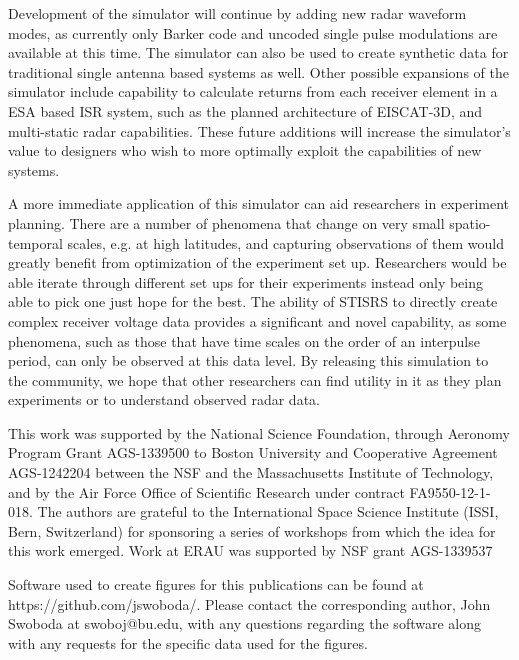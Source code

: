 \documentclass[draft,ras]{agutex}
\begin{document}
\begin{article}
Development of the simulator will continue by adding new radar waveform modes, as currently only Barker code and uncoded single pulse modulations are available at this time. The simulator can also be used to create synthetic data for traditional single antenna based systems as well. Other possible expansions of the simulator include capability to calculate returns from each receiver element in a ESA based ISR system, such as the planned architecture of EISCAT-3D, and multi-static radar capabilities. These future additions will increase the simulator's value to designers who wish to more optimally exploit the capabilities of new systems. 

A more immediate application of this simulator can aid researchers in experiment planning. There are a number of phenomena that change on very small spatio-temporal scales, e.g. at high latitudes, and capturing observations of them would greatly benefit from optimization of the experiment set up. Researchers would be able iterate through different set ups for their experiments instead only being able to pick one just hope for the best. The ability of STISRS to directly create complex receiver voltage data provides a significant and novel capability, as some phenomena, such as those that have time scales on the order of an interpulse period, can only be observed at this data level. By releasing this simulation to the community, we hope that other researchers can find utility in it as they plan experiments or to understand observed radar data. 

\begin{acknowledgments}
This work was supported by the National Science Foundation, through Aeronomy Program Grant AGS-1339500 to Boston University and Cooperative Agreement AGS-1242204 between the NSF and the Massachusetts Institute of Technology, and by the Air Force Office of Scientific Research under contract FA9550-12-1-018.   The authors are grateful to the International Space Science Institute (ISSI, Bern, Switzerland) for sponsoring a series of workshops from which the idea for this work emerged. Work at ERAU was supported by NSF grant AGS-1339537

Software used to create figures for this publications can be found at https://github.com/jswoboda/. Please contact the corresponding author, John Swoboda at swoboj@bu.edu, with any questions regarding the software along with any requests for the specific data used for the figures. \end{acknowledgments}




\end{article}
\end{document}
